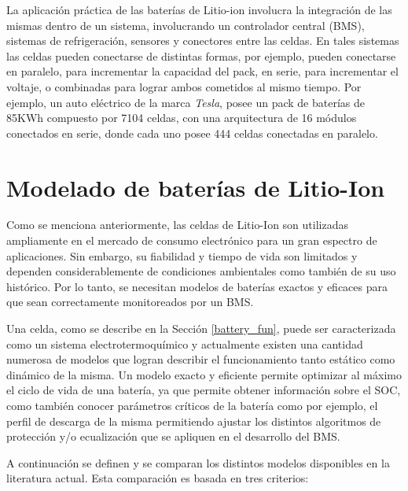 \noindent La aplicación práctica de las baterías de Litio-ion involucra la
integración de las mismas dentro de un sistema, involucrando un controlador
central (\acrshort{BMS}), sistemas de refrigeración, sensores y conectores entre
las celdas. En tales sistemas las celdas pueden conectarse de distintas formas,
por ejemplo, pueden conectarse en paralelo, para incrementar la capacidad del
pack, en serie, para incrementar el voltaje, o combinadas para lograr ambos
cometidos al mismo tiempo. Por ejemplo, un auto eléctrico de la marca
\emph{Tesla}, posee un pack de baterías de 85KWh compuesto por 7104 celdas, con
una arquitectura de 16 módulos conectados en serie, donde cada uno posee 444
celdas conectadas en paralelo.

\section{Modelado de bater\'ias de Litio-Ion}\label{litioModel}

\noindent Como se menciona anteriormente, las celdas de Litio-Ion son utilizadas
ampliamente en el mercado de consumo electr\'onico para un gran espectro de 
aplicaciones. Sin embargo, su fiabilidad y tiempo de vida son limitados y 
dependen considerablemente de condiciones ambientales como también de su uso 
hist\'orico. Por lo tanto, se necesitan modelos de bater\'ias exactos y eficaces 
para que sean correctamente monitoreados por un \acrshort{BMS}.

\noindent Una celda, como se describe en la Secci\'on \ref{battery_fun}, puede 
ser caracterizada como un sistema electrotermoqu\'imico y actualmente existen 
una cantidad numerosa de modelos que logran describir el funcionamiento tanto 
est\'atico como din\'amico de la misma. Un modelo exacto y eficiente permite 
optimizar al m\'aximo el ciclo de vida de una bater\'ia, ya que permite 
obtener informaci\'on sobre el \acrshort{SOC}, como tambi\'en conocer 
par\'ametros cr\'iticos de la bater\'ia como por ejemplo, el perfil de descarga 
de la misma permitiendo ajustar los distintos algoritmos de protecci\'on y/o 
ecualizaci\'on que se apliquen en el desarrollo del \acrshort{BMS}.

\newpage

A continuaci\'on se definen y se comparan los distintos modelos disponibles 
en la literatura actual. Esta comparaci\'on es basada en tres criterios:

